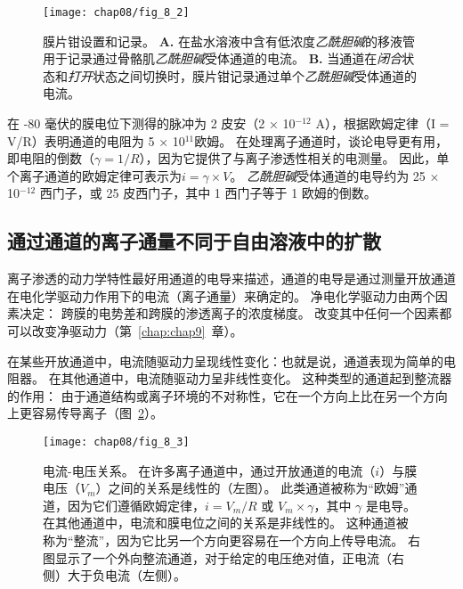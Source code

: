 \begin{figure}[htbp]
	\centering
	\texttt{[image: chap08/fig\_8\_2]}
	\caption{膜片钳设置和记录。
	\textbf{A.} 在盐水溶液中含有低浓度\textit{乙酰胆碱}的移液管用于记录通过骨骼肌\textit{乙酰胆碱}受体通道的电流\cite{alberts2017molecular}。
	\textbf{B.} 当通道在\textit{闭合}状态和\textit{打开}状态之间切换时，膜片钳记录通过单个\textit{乙酰胆碱}受体通道的电流。}
	\label{fig:8_2}
\end{figure}



在 -80 毫伏的膜电位下测得的脉冲为 2 皮安（2 × 10$^{-12}$ A），根据欧姆定律（I = V/R）表明通道的电阻为 5 × 10$^{11}$欧姆。
在处理离子通道时，谈论电导更有用，即电阻的倒数（$\gamma = 1/R$），因为它提供了与离子渗透性相关的电测量。
因此，单个离子通道的欧姆定律可表示为$i=\gamma \times V$。
\textit{乙酰胆碱}受体通道的电导约为 25 × 10$^{-12}$ 西门子，或 25 皮西门子，其中 1 西门子等于 1 欧姆的倒数。



\subsection{通过通道的离子通量不同于自由溶液中的扩散}

离子渗透的动力学特性最好用通道的电导来描述，通道的电导是通过测量开放通道在电化学驱动力作用下的电流（离子通量）来确定的。
净电化学驱动力由两个因素决定：
跨膜的电势差和跨膜的渗透离子的浓度梯度。
改变其中任何一个因素都可以改变净驱动力（第~\ref{chap:chap9}~章）。


在某些开放通道中，电流随驱动力呈现线性变化：也就是说，通道表现为简单的电阻器。
在其他通道中，电流随驱动力呈非线性变化。
这种类型的通道起到整流器的作用：
由于通道结构或离子环境的不对称性，它在一个方向上比在另一个方向上更容易传导离子（图~\ref{fig:8_3}）。


\begin{figure}[htbp]
	\centering
	\texttt{[image: chap08/fig\_8\_3]}
	\caption{电流-电压关系。
		在许多离子通道中，通过开放通道的电流（$i$）与膜电压（$V_m$）之间的关系是线性的（左图）。
		此类通道被称为“欧姆”通道，因为它们遵循欧姆定律，$i = V_m /R$ 或 $ V_m \times \gamma $，其中 $\gamma$ 是电导。
		在其他通道中，电流和膜电位之间的关系是非线性的。
		这种通道被称为“整流”，因为它比另一个方向更容易在一个方向上传导电流。
		右图显示了一个外向整流通道，对于给定的电压绝对值，正电流（右侧）大于负电流（左侧）。}
	\label{fig:8_3}
\end{figure}


